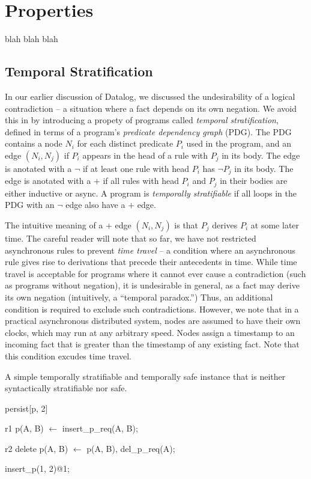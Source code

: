 \section{Properties}

blah blah blah

\subsection{Temporal Stratification}

In our earlier discussion of Datalog, we discussed the undesirability of a logical contradiction -- a situation where a fact depends on its own negation.  We avoid this in \lang by introducing a propety of programs called {\em temporal stratification}, defined in terms of a program's {\em predicate dependency graph} (PDG).  The PDG contains a node $N_i$ for each distinct predicate $P_i$ used in the program, and an edge $(N_i, N_j)$ if $P_i$ appears in the head of a rule with $P_j$ in its body.  The edge is anotated with a $\lnot$ if at least one rule with head $P_i$ has $\lnot P_j$ in its body.  The edge is anotated with a $+$ if all rules with head $P_i$ and $P_j$ in their bodies are either inductive or async.  A \lang program is {\em temporally stratifiable} if all loops in the PDG with an $\lnot$ edge also have a $+$ edge.

The intuitive meaning of a $+$ edge $(N_i, N_j)$ is that $P_j$ derives $P_i$ at some later time.  The careful reader will note that so far, we have not restricted asynchronous rules to prevent {\em time travel} -- a condition where an asynchronous rule gives rise to derivations that precede their antecedents in time.  While time travel is acceptable for programs where it cannot ever cause a contradiction (such as programs without negation), it is undesirable in general, as a fact may derive its own negation (intuitively, a ``temporal paradox.'')  Thus, an additional condition is required to exclude such contradictions.  However, we note that in a practical asynchronous distributed system, nodes are assumed to have their own clocks, which may run at any arbitrary speed.  Nodes assign a timestamp to an incoming fact that is greater than the timestamp of any existing fact.  Note that this condition excudes time travel.

\begin{example}
\label{ex:stratsafe}
A simple temporally stratifiable and temporally safe \slang instance that is neither syntactically stratifiable nor safe.

\begin{Dedalus}
persist[p, 2]  
  
r1
p(A, B) \(\leftarrow\)
  insert\_p\_req(A, B);

r2  
delete p(A, B) \(\leftarrow\)
  p(A, B),
  del\_p\_req(A);

insert\_p(1, 2)@1;
\end{Dedalus}
\end{example}

